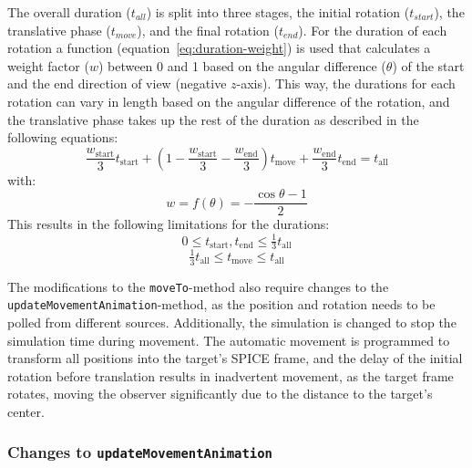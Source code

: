 The overall duration ($t_{all}$) is split into three stages, the initial rotation ($t_{start}$), the translative phase
($t_{move}$), and the final rotation ($t_{end}$).
For the duration of each rotation a function (equation~\ref{eq:duration-weight}) is used that calculates a weight
factor ($w$) between 0 and 1 based on the angular difference ($\theta$) of the start and the end direction of view
(negative $z$-axis).
This way, the durations for each rotation can vary in length based on the angular difference of the rotation, and the
translative phase takes up the rest of the duration as described in the following equations:
\begin{equation}
    \label{eq:duration-timings}
    \frac{w_{\mathrm{start}}}{3} t_{\mathrm{start}} + (1 - \frac{w_{\mathrm{start}}}{3} - \frac{w_{\mathrm{end}}}{3})
    t_{\mathrm{move}} +
    \frac{w_{\mathrm{end}}}{3} t_{\mathrm{end}} = t_{\mathrm{all}}
\end{equation}
with:
\begin{equation}
    \label{eq:duration-weight}
    w = f(\theta) = - \frac{\cos{\theta} - 1}{2}
\end{equation}
This results in the following limitations for the durations:
\begin{equation}
    \label{eq:duration-result-rot}
    0 \leq t_{\mathrm{start}}, t_{\mathrm{end}} \leq \tfrac{1}{3} t_{\mathrm{all}}
\end{equation}
\begin{equation}
    \label{eq:duration-result-mov}
    \tfrac{1}{3} t_{\mathrm{all}} \leq t_{\mathrm{move}} \leq t_{\mathrm{all}}
\end{equation}

The modifications to the \texttt{moveTo}-method also require changes to the
\texttt{updateMovementAnimation}-method, as the position and rotation needs to be polled from different sources.
Additionally, the simulation is changed to stop the simulation time during movement.
The automatic movement is programmed to transform all positions into the target's SPICE frame, and the delay of the
initial rotation before translation results in inadvertent movement, as the target frame rotates, moving the observer
significantly due to the distance to the target's center.

\subsubsection{Changes to \texttt{updateMovementAnimation}}\label{subsubsec:changes-to-updatemovementanimation}

